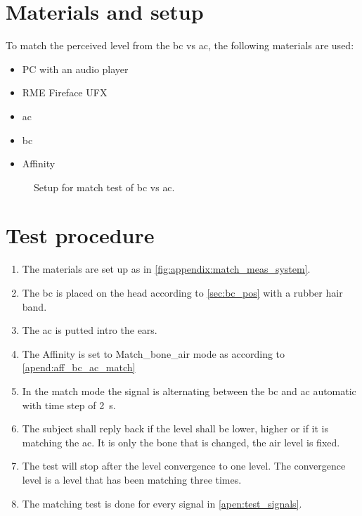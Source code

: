 \section*{Materials and setup}
To match the perceived level from the \gls{bc} vs \gls{ac}, the following materials are used:
\begin{itemize}
\item PC with an audio player
\item RME Fireface UFX
\item \gls{ac}
\item \gls{bc}
\item Affinity
\end{itemize}

\begin{figure}[H]
\centering
\def\svgwidth{\columnwidth}

\caption{Setup for match test of \gls{bc} vs \gls{ac}.}
		\label{fig:appendix:match_meas_system}
\end{figure}

\section*{Test procedure}


\begin{enumerate}
\item The materials are set up as in \autoref{fig:appendix:match_meas_system}.
\item The \gls{bc} is placed on the head according to \autoref{sec:bc_pos} with a rubber hair band.
\item The \gls{ac} is putted intro the ears.
\item The Affinity is set to Match_bone_air mode as according to \autoref{apend:aff_bc_ac_match} 
\item In the match mode the signal is alternating between the \gls{bc} and \gls{ac} automatic with time step of \SI{2}{\second}.
\item The  subject shall reply back if the level shall be lower, higher or if it is matching the \gls{ac}. It is only the bone that is changed, the air level is fixed.
\item The test will stop after the level convergence to one level. The convergence level is a level that has been matching three times.
\item The matching test is done for every signal in \autoref{apen:test_signals}.
\end{enumerate}


